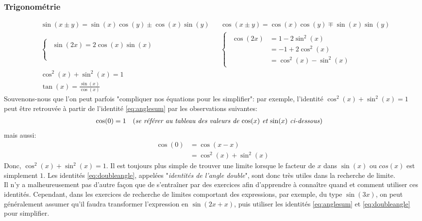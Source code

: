 \documentclass{article}
\numberwithin{equation}{section}
\begin{document}
\subsubsection{Trigonométrie}
\begin{align}
	\label{eq:anglesum}
	&\sin(x \pm y) 	= \sin(x) \cos(y) \pm \cos(x) \sin(y)	& &\cos(x \pm y) 	= \cos(x) \cos(y) \mp \sin(x)\sin(y) \\
	\label{eq:doubleangle}
	&\begin{cases}
		\begin{aligned}	
			\sin(2x) = 2\cos(x)\sin(x) \\ 
						\\ 
						\\
		\end{aligned} 
	\end{cases} & &\begin{cases}
		\begin{aligned}
			\cos(2x) 	&= 1 - 2\sin^2(x) \\
						&= -1 + 2\cos^2(x)  \\
						&= \cos^2(x) - \sin^2(x)
		\end{aligned}
	\end{cases} \\
	&\cos^2(x) + \sin^2(x) = 1 \\
	&\tan(x) = \frac{\sin(x)}{\cos(x)} 
\end{align}
Souvenons-nous que l'on peut parfois "compliquer nos équations pour les simplifier": par exemple, l'identité \(\cos^2(x) + \sin^2(x) = 1\) peut être retrouvée à partir de l'identité \ref{eq:anglesum} par les observations suivantes: 
\vspace{-0.2cm}
\begin{align*}
	\cos(0) 	&= 1 \quad \text{(\emph{se référer au tableau des valeurs de \(\cos(x)\) et \(\sin(x)\) ci-dessous})}
\end{align*}
\vspace{-0.2cm}
mais aussi: 
\begin{align*}
	\cos(0)	&= \cos(x-x) \\
				&= \cos^2(x) + \sin^2(x) 
\end{align*}
Donc, \(\cos^2(x) + \sin^2(x) = 1\). 
Il est toujours plus simple de trouver une limite lorsque le facteur de \(x\) dans \(\sin(x)\) ou \(cos(x)\) est simplement \(1\). Les identités \ref{eq:doubleangle}, appelées "\emph{identités de l'angle double}", sont donc très utiles dans la recherche de limite. \\
Il n'y a malheureusement pas d'autre façon que de s'entraîner par des exercices afin d'apprendre à connaître quand et comment utiliser ces identités. Cependant, dans les exercices de recherche de limites comportant des expressions, par exemple, du type \(\sin(3x)\), on peut généralement assumer qu'il faudra transformer l'expression en \(\sin(2x + x)\), puis utiliser les identités \ref{eq:anglesum} et \ref{eq:doubleangle} pour simplifier.
\end{document}
